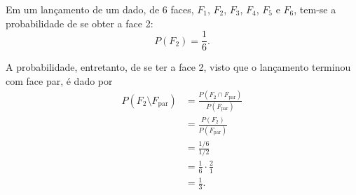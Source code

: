 \documentclass[11pt,fleqn]{book}
\numberwithin{mpicture}{chapter}
\numberwithin{mtable}{chapter}
\numberwithin{mframe}{chapter}
\begin{document}
\begin{example}
	Em um lançamento de um dado, de 6 faces, $F_1$, $F_2$, $F_3$, $F_4$, $F_5$ e $F_6$, tem-se a probabilidade de se obter a face 2:
	\[
		P(F_2)=\frac{1}{6}\text{.}
	\]
	
	A probabilidade, entretanto, de se ter a face 2, visto que o lançamento terminou com face par, é dado por
	\begin{align*}
		P(F_2\setminus F_{\text{par}})&=\frac{P(F_2 \cap F_{\text{par}})}{P(F_{\text{par}})}\\
									   &=\frac{P(F_2)}{P(F_{\text{par}})}\\
									   &=\frac{1/6}{1/2}\\
									   &=\frac{1}{6}\cdot \frac{2}{1}\\
									   &=\frac{1}{3}\text{.}
	\end{align*}
\end{example}

\newpage
\end{document}
